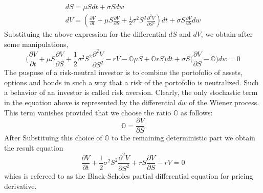 \documentclass[a4paper]{article}
\begin{document}
\begin{equation}
    \begin{array}{l}
    {d S=\mu S d t+\sigma S d w} \\
    {d V=\left(\frac{\partial V}{\partial t}+\mu S \frac{\partial V}{\partial S}+\frac{1}{2} \sigma^{2} S^{2} \frac{\partial^{2} V}{\partial S^{2}}\right) d t+\sigma S \frac{\partial V}{\partial S} d w}
    \end{array}
\end{equation}
Substituing the above expression for the differential $dS$ and $dV$, we obtain after some manipulations,
\begin{equation}
    \bigg(\frac{\partial V}{\partial t}+\mu S \frac{\partial V}{\partial S}+\frac{1}{2} \sigma^{2} S^{2} \frac{\partial^{2} V}{\partial S^{2}}-r V- \mathbb{O}\mu S+ \mathbb{O}r S \bigg)  d t+  \sigma S\bigg(\frac{\partial V}{\partial S}- \mathbb{O} \bigg) d w=0
\end{equation}
The puspose of a risk-neutral investor is to combine the portofolio of assets, options and bonds in such a way that a risk of the portofolio is neutralized. Such a behavior of an investor is called risk aversion. Clearly, the only 
stochastic term in the equation above is represented by the differential $dw$ of the Wiener process. This term vanishes provided that we choose the ratio $\mathbb{O}$ as follows:
\begin{equation}
    \mathbb{O}=\frac{\partial V}{\partial S}
\end{equation}
After Substituing this choice of $\mathbb{O}$ to the remaining deterministic part we obtain the result equation
\begin{equation}
    \frac{\partial V}{\partial t}+\frac{1}{2} \sigma^{2} S^{2} \frac{\partial^{2} V}{\partial S^{2}}+r S \frac{\partial V}{\partial S}-r V=0
\end{equation}
whics is refereed to as the Black-Scholes partial differential equation for pricing derivative. \par 
\end{document}
